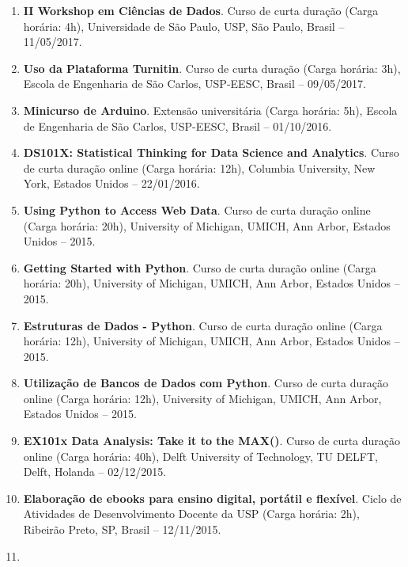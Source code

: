 \documentclass[
  brazilian,
  11pt,
  a4paper,
]{article}
\providecommand{\tightlist}{%
  \setlength{\itemsep}{0pt}\setlength{\parskip}{0pt}}
\begin{document}
\begin{enumerate}
  \begin{itemize}
  \tightlist
  \item
    ``\emph{Deep Learning}'' (Carga horária: 8h)
  \item
    ``\emph{Visualização de dados}'' (Carga horária: 8h)
  \item
    ``\emph{Aprendizado de Máquinas}'' (Carga horária: 8h).
  \end{itemize}
\item
  \textbf{II Workshop em Ciências de Dados}. Curso de curta duração
  (Carga horária: 4h), Universidade de São Paulo, USP, São Paulo, Brasil
  -- 11/05/2017.
\item
  \textbf{Uso da Plataforma Turnitin}. Curso de curta duração (Carga
  horária: 3h), Escola de Engenharia de São Carlos, USP-EESC, Brasil --
  09/05/2017.
\item
  \textbf{Minicurso de Arduino}. Extensão universitária (Carga horária:
  5h), Escola de Engenharia de São Carlos, USP-EESC, Brasil --
  01/10/2016.
\item
  \textbf{DS101X: Statistical Thinking for Data Science and Analytics}.
  Curso de curta duração online (Carga horária: 12h), Columbia
  University, New York, Estados Unidos -- 22/01/2016.
\item
  \textbf{Using Python to Access Web Data}. Curso de curta duração
  online (Carga horária: 20h), University of Michigan, UMICH, Ann Arbor,
  Estados Unidos -- 2015.
\item
  \textbf{Getting Started with Python}. Curso de curta duração online
  (Carga horária: 20h), University of Michigan, UMICH, Ann Arbor,
  Estados Unidos -- 2015.
\item
  \textbf{Estruturas de Dados - Python}. Curso de curta duração online
  (Carga horária: 12h), University of Michigan, UMICH, Ann Arbor,
  Estados Unidos -- 2015.
\item
  \textbf{Utilização de Bancos de Dados com Python}. Curso de curta
  duração online (Carga horária: 12h), University of Michigan, UMICH,
  Ann Arbor, Estados Unidos -- 2015.
\item
  \textbf{EX101x Data Analysis: Take it to the MAX()}. Curso de curta
  duração online (Carga horária: 40h), Delft University of Technology,
  TU DELFT, Delft, Holanda -- 02/12/2015.
\item
  \textbf{Elaboração de ebooks para ensino digital, portátil e
  flexível}. Ciclo de Atividades de Desenvolvimento Docente da USP
  (Carga horária: 2h), Ribeirão Preto, SP, Brasil -- 12/11/2015.
\item

\end{enumerate}
\end{document}
